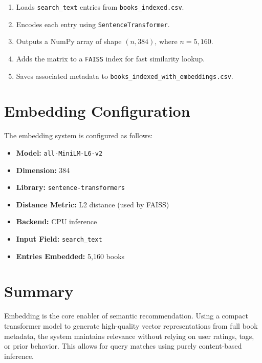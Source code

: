 \begin{enumerate}
    \item Loads \texttt{search\_text} entries from \texttt{books\_indexed.csv}.
    \item Encodes each entry using \texttt{SentenceTransformer}.
    \item Outputs a NumPy array of shape $(n, 384)$, where $n=5,160$.
    \item Adds the matrix to a \texttt{FAISS} index for fast similarity lookup.
    \item Saves associated metadata to \texttt{books\_indexed\_with\_embeddings.csv}.
\end{enumerate}

\section{Embedding Configuration}
\label{sec:embedding-config}

The embedding system is configured as follows:

\begin{itemize}
    \item \textbf{Model:} \texttt{all-MiniLM-L6-v2}
    \item \textbf{Dimension:} 384
    \item \textbf{Library:} \texttt{sentence-transformers}
    \item \textbf{Distance Metric:} L2 distance (used by FAISS)
    \item \textbf{Backend:} CPU inference
    \item \textbf{Input Field:} \texttt{search\_text}
    \item \textbf{Entries Embedded:} 5,160 books
\end{itemize}

\section{Summary}
\label{sec:embedding-summary}

Embedding is the core enabler of semantic recommendation. Using a compact transformer model to generate high-quality vector representations from full book metadata, the system maintains relevance without relying on user ratings, tags, or prior behavior. 
This allows for query matches using purely content-based inference.
